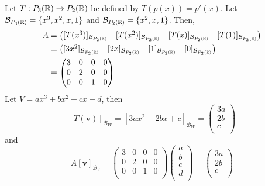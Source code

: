 \documentclass{article}
\begin{document}
\begin{example}
  Let $T: P_3(\mathbb{R}) \to P_2(\mathbb{R})$ be defined by $T(p(x)) = p'(x)$. Let $\mathcal{B}_{P_3(\mathbb{R})} = \{x^3, x^2, x, 1\}$ and $\mathcal{B}_{P_2(\mathbb{R})} = \{x^2, x, 1\}$. Then,
  \begin{align*}
    A &=
    \begin{pmatrix}
      [T(x^3)]_{\mathcal{B}_{P_2(\mathbb{R})}} & [T(x^2)]_{\mathcal{B}_{P_2(\mathbb{R})}} & [T(x)]_{\mathcal{B}_{P_2(\mathbb{R})}} & [T(1)]_{\mathcal{B}_{P_2(\mathbb{R})}}
    \end{pmatrix}\\
    &=
    \begin{pmatrix}
      [3x^2]_{\mathcal{B}_{P_2(\mathbb{R})}} & [2x]_{\mathcal{B}_{P_2(\mathbb{R})}} & [1]_{\mathcal{B}_{P_2(\mathbb{R})}} & [0]_{\mathcal{B}_{P_2(\mathbb{R})}}\\
    \end{pmatrix}\\
    &=
    \begin{pmatrix}
      3 & 0 & 0 & 0\\
      0 & 2 & 0 & 0\\
      0 & 0 & 1 & 0\\
    \end{pmatrix}
  \end{align*}
  Let $V = ax^3 + bx^2 + cx + d$, then \[[T(\textbf{v})]_{\mathcal{B}_W} = [3ax^2 + 2bx + c]_{\mathcal{B}_W} =
    \begin{pmatrix}
      3a\\2b\\c\\
  \end{pmatrix}\] and \[A[\textbf{v}]_{\mathcal{B}_V} =
    \begin{pmatrix}
      3 & 0 & 0 & 0\\
      0 & 2 & 0 & 0\\
      0 & 0 & 1 & 0\\
    \end{pmatrix}
    \begin{pmatrix}
      a\\b\\c\\d\\
    \end{pmatrix} =
    \begin{pmatrix}
      3a\\2b\\c\\
  \end{pmatrix}\]
\end{example}
\end{document}
